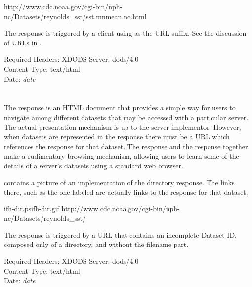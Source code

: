 \documentclass[justify]{dods-paper}
\begin{document}
%
{http://www.cdc.noaa.gov/cgi-bin/nph-nc/Datasets/reynolds_sst/sst.mnmean.nc.html}

The \HTML response is triggered by a client using  as the
URL suffix.  See the discussion of \opendap URLs in \DAPHTTP.

\begin{textoutput}{Required Headers:}
XDODS-Server: dods/4.0 \\
Content-Type: text/html\\
Date: \emph{date}
\end{textoutput}



\section{\DIR}
\label{sec-dir}

The \DIR response is an HTML document that provides a simple way for
users to navigate among different datasets that may be accessed with a
particular server. The actual presentation mechanism is up to the
server implementor.  However, when datasets are represented in the
response there must be a URL which references the \HTML response for
that dataset.  The \HTML response and the \DIR response together make
a rudimentary browsing mechanism, allowing users to learn some of the
details of a server's datasets using a standard web browser.

 contains a picture of an implementation of the
directory response.  The links there, such as the one labeled
 are actually links to the \HTML response for that
dataset. 

%
{ifh-dir.ps}{ifh-dir.gif}%
{http://www.cdc.noaa.gov/cgi-bin/nph-nc/Datasets/reynolds_sst/}

The \DIR response is triggered by a URL that contains an
incomplete Dataset ID, composed only of a directory, and without the
filename part.

\begin{textoutput}{Required Headers:}
XDODS-Server: dods/4.0\\
Content-Type: text/html\\
Date: \emph{date}
\end{textoutput}




\appendix


\T{}
\T\raggedright

\end{document}
